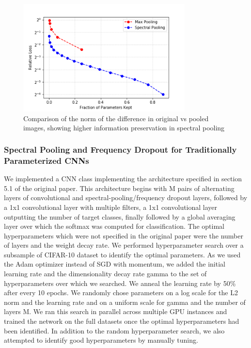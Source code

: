 \documentclass[10pt,journal,compsoc]{IEEEtran}
\begin{document}
\begin{figure}[ht]
\centering
  \includegraphics[width=250pt]{images/Figure4_Approximation_Loss.png}
  \caption{Comparison of the norm of the difference in original vs pooled images, showing higher information preservation in spectral pooling}
  \label{fig:preserve}
\end{figure}

\subsubsection{Spectral Pooling and Frequency Dropout for Traditionally Parameterized CNNs} \label{ssec:spec_pool_architecture}

We implemented a CNN class implementing the architecture specified in section 5.1 of the original paper. This architecture begins with M pairs of alternating layers of convolutional and spectral-pooling/frequency dropout layers, followed by a 1x1 convolutional layer with multiple filters, a 1x1 convolutional layer outputting the number of target classes, finally followed by a global averaging layer \cite{global_average} over which the softmax was computed for classification. The optimal hyperparameters which were not specified in the original paper were the number of layers and the weight decay rate. We performed hyperparameter search over a subsample of CIFAR-10 dataset \cite{cifar10} to identify the optimal parameters. As we used the Adam optimizer \cite{adam} instead of SGD with momentum, we added the initial learning rate and the dimensionality decay rate gamma to the set of hyperparameters over which we searched. We anneal the learning rate by 50\% after every 10 epochs. We randomly chose parameters on a log scale for the L2 norm and the learning rate and on a uniform scale for gamma and the number of layers M. We ran this search in parallel across multiple GPU instances and trained the network on the full datasets once the optimal hyperparameters had been identified. In addition to the random hyperparameter search, we also attempted to identify good hyperparameters by manually tuning.
\end{document}
